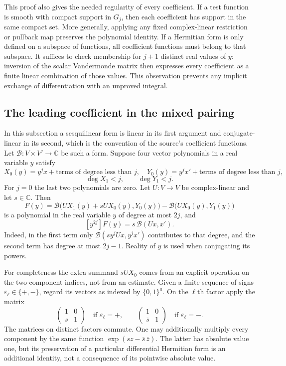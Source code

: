 This proof also gives the needed regularity of every coefficient.
If a test function is smooth with compact support in $G_j$,
then each coefficient has support in the same compact set.
More generally, applying any fixed complex-linear restriction
or pullback map preserves the polynomial identity.  If a
Hermitian form is only defined on a subspace of functions,
all coefficient functions must belong to that subspace.
It suffices to check membership for $j+1$ distinct real
values of $y$: inversion of the scalar Vandermonde matrix
then expresses every coefficient as a finite linear combination
of those values.  This observation prevents any implicit
exchange of differentiation with an unproved integral.

\subsection{The leading coefficient in the mixed pairing}

In this subsection a sesquilinear form is linear in its first
argument and conjugate-linear in its second, which is the
convention of the source's coefficient functions.
Let $\mathcal B:V\times V'\to\mathbb C$ be such a form.
Suppose four vector polynomials in a real variable $y$ satisfy
\[
 X_0(y)=y^j x+\text{terms of degree less than }j,\quad
 Y_0(y)=y^j x'+\text{terms of degree less than }j,
\]
\[
 \deg X_1<j,\qquad \deg Y_1<j.
\]
For $j=0$ the last two polynomials are zero.
Let $U:V\to V$ be complex-linear and let $s\in\mathbb C$.
Then
\begin{equation}\label{ca-mixed-polynomial}
 F(y)=
 \mathcal B\bigl(U X_1(y)+sU X_0(y),Y_0(y)\bigr)
       -\mathcal B\bigl(U X_0(y),Y_1(y)\bigr)
\end{equation}
is a polynomial in the real variable $y$ of degree at most $2j$,
and
\begin{equation}\label{ca-mixed-leading}
 [y^{2j}]F(y)=s\,\mathcal B(Ux,x').
\end{equation}
Indeed, in the first term only
$\mathcal B(sy^j Ux,y^j x')$ contributes to that degree,
and the second term has degree at most $2j-1$.
Reality of $y$ is used when conjugating its powers.

For completeness the extra summand $sU X_0$ comes from an
explicit operation on the two-component indices, not from
an estimate.  Given a finite sequence of signs
$\varepsilon_\ell\in\{+,-\}$, regard its vectors as indexed by
$\{0,1\}^a$.  On the $\ell$th factor apply the matrix
\[
 \begin{pmatrix}1&0\\ s&1\end{pmatrix}
 \quad\text{if }\varepsilon_\ell=+,\qquad
 \begin{pmatrix}1&0\\ \overline s&1\end{pmatrix}
 \quad\text{if }\varepsilon_\ell=-.
\]
The matrices on distinct factors commute.  One may additionally
multiply every component by the same function
$\exp(sz-\overline s\,\overline z)$.
The latter has absolute value one, but its preservation of
a particular differential Hermitian form is an additional
identity, not a consequence of its pointwise absolute value.

